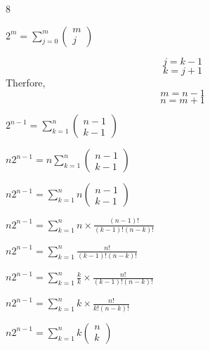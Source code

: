 \documentclass[12 pt]{article}
\begin{document}
    \begin{exercise}{8}
    \hfill

    $2^m = \sum_{j=0}^{m} \begin{pmatrix}
        m \\
        j
    \end{pmatrix}$

    $$j = k - 1$$
    $$k = j + 1$$
    Therfore,
    $$m = n - 1$$
    $$n = m + 1$$

    $2^{n - 1} = \sum_{k = 1}^{n} \begin{pmatrix}
        n - 1 \\
        k - 1
    \end{pmatrix}$

    $n2^{n - 1} = n \sum_{k = 1}^{n} \begin{pmatrix}
        n - 1 \\
        k - 1
    \end{pmatrix}$

    $n2^{n - 1} = \sum_{k = 1}^{n} n \begin{pmatrix}
        n - 1 \\
        k - 1
    \end{pmatrix}$

    $n2^{n - 1} = \sum_{k = 1}^{n} n \times \frac{(n - 1)!}{(k - 1)!(n - k)!}$

    $n2^{n - 1} = \sum_{k = 1}^{n} \frac{n!}{(k - 1)!(n - k)!}$

    $n2^{n - 1} = \sum_{k = 1}^{n} \frac{k}{k} \times \frac{n!}{(k - 1)!(n - k)!}$

    $n2^{n - 1} = \sum_{k = 1}^{n} k \times \frac{n!}{k!(n - k)!}$

    $n2^{n - 1} = \sum_{k = 1}^{n} k \begin{pmatrix}
        n \\
        k
    \end{pmatrix}$
    \end{exercise}
\end{document}
